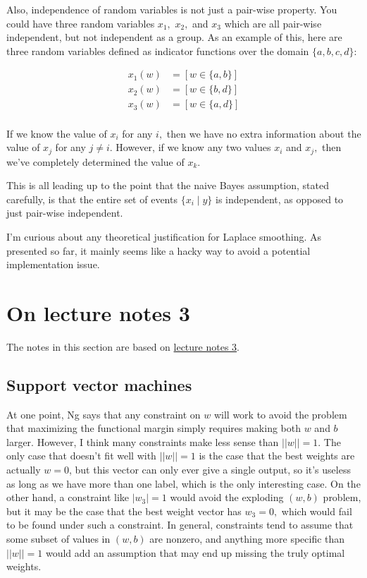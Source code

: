 \documentclass[]{article}
\begin{document}
Also, independence of random variables is not just a pair-wise property.
You could have three random variables \(x_1,\) \(x_2,\) and \(x_3\)
which are all pair-wise independent, but not independent as a group. As
an example of this, here are three random variables defined as indicator
functions over the domain \(\{a, b, c, d\}:\)

\[\begin{aligned}
x_1(w) & = [w \in \{a, b\}] \\
x_2(w) & = [w \in \{b, d\}] \\
x_3(w) & = [w \in \{a, d\}] \\
\end{aligned}\]

If we know the value of \(x_i\) for any \(i,\) then we have no extra
information about the value of \(x_j\) for any \(j\ne i.\) However, if
we know any two values \(x_i\) and \(x_j,\) then we've completely
determined the value of \(x_k.\)

This is all leading up to the point that the naive Bayes assumption,
stated carefully, is that the entire set of events \(\{x_i \mid y\}\) is
independent, as opposed to just pair-wise independent.

I'm curious about any theoretical justification for Laplace smoothing.
As presented so far, it mainly seems like a hacky way to avoid a
potential implementation issue.

\section{On lecture notes 3}\label{on-lecture-notes-3}

The notes in this section are based on
\href{http://cs229.stanford.edu/notes/cs229-notes3.pdf}{lecture notes
3}.

\subsection{Support vector machines}\label{support-vector-machines}

At one point, Ng says that any constraint on \(w\) will work to avoid
the problem that maximizing the functional margin simply requires making
both \(w\) and \(b\) larger. However, I think many constraints make less
sense than \(||w||=1.\) The only case that doesn't fit well with
\(||w||=1\) is the case that the best weights are actually \(w=0\), but
this vector can only ever give a single output, so it's useless as long
as we have more than one label, which is the only interesting case. On
the other hand, a constraint like \(|w_3|=1\) would avoid the exploding
\((w,b)\) problem, but it may be the case that the best weight vector
has \(w_3=0,\) which would fail to be found under such a constraint. In
general, constraints tend to assume that some subset of values in
\((w,b)\) are nonzero, and anything more specific than \(||w||=1\) would
add an assumption that may end up missing the truly optimal weights.
\end{document}
